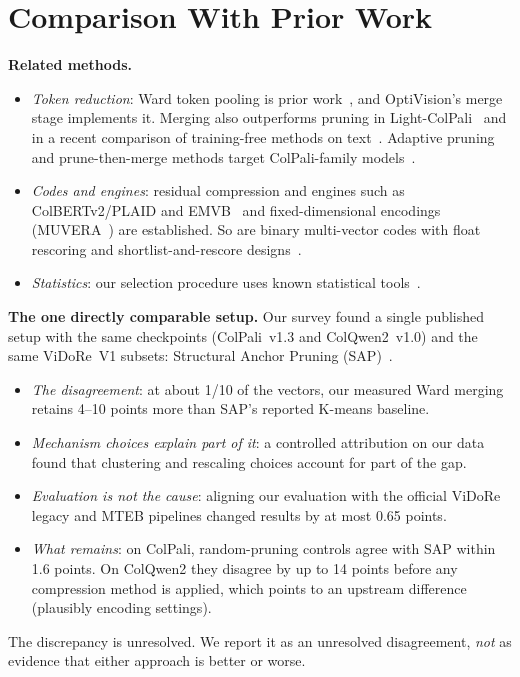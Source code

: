 \documentclass[conference]{IEEEtran}
\begin{document}
\section{Comparison With Prior Work}
\label{sec:prior}

\textbf{Related methods.}
\begin{itemize}
\item \emph{Token reduction}: Ward token pooling is prior work~\cite{clavie2024pooling},
and OptiVision's merge stage implements it. Merging also outperforms pruning in
Light-ColPali~\cite{lightcolpali} and in a recent comparison of training-free methods
on text~\cite{jha2026comparison}. Adaptive pruning and prune-then-merge methods target
ColPali-family models~\cite{docpruner2025,sculpting2026,adamerge2026}.
\item \emph{Codes and engines}: residual compression and engines such as
ColBERTv2/PLAID and EMVB~\cite{colbertv2,plaid,emvb} and fixed-dimensional encodings
(MUVERA~\cite{muvera}) are established. So are binary multi-vector codes with float
rescoring and shortlist-and-rescore designs~\cite{vespa2024colpali,qdrant}.
\item \emph{Statistics}: our selection procedure uses known statistical
tools~\cite{waudbysmith2024betting,westfall2001fixedsequence,angelopoulos2021ltt}.
\end{itemize}

\textbf{The one directly comparable setup.} Our survey found a single published setup
with the same checkpoints (ColPali~v1.3 and ColQwen2~v1.0) and the same ViDoRe~V1
subsets: Structural Anchor Pruning (SAP)~\cite{structuralanchor2026}.
\begin{itemize}
\item \emph{The disagreement}: at about 1/10 of the vectors, our measured Ward merging
retains 4--10 points more than SAP's reported K-means baseline.
\item \emph{Mechanism choices explain part of it}: a controlled attribution on our data
found that clustering and rescaling choices account for part of the gap.
\item \emph{Evaluation is not the cause}: aligning our evaluation with the official
ViDoRe legacy and MTEB pipelines changed results by at most 0.65 points.
\item \emph{What remains}: on ColPali, random-pruning controls agree with SAP within 1.6
points. On ColQwen2 they disagree by up to 14 points before any compression method is
applied, which points to an upstream difference (plausibly encoding settings).
\end{itemize}
The discrepancy is unresolved. We report it as an unresolved disagreement, \emph{not}
as evidence that either approach is better or worse.
\end{document}
